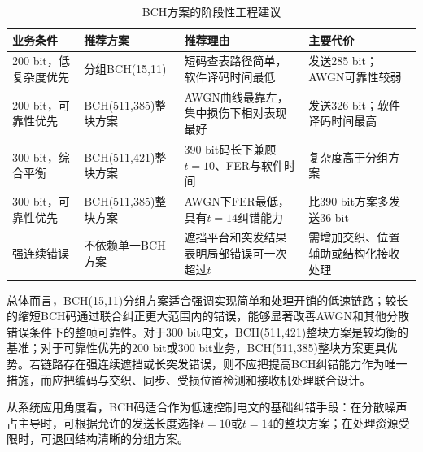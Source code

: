 \begin{table}[htbp]
  \centering
  \scriptsize
  \caption{BCH方案的阶段性工程建议}
  \label{tab:bch-conclusions}
  \setlength{\tabcolsep}{3pt}
  \begin{tabular}{p{}p{}p{}p{}}
    \toprule
    业务条件 & 推荐方案 & 推荐理由 & 主要代价 \\
    \midrule
    200 bit，低复杂度优先 & 分组BCH(15,11) & 短码查表路径简单，软件译码时间最低 & 发送285 bit；AWGN可靠性较弱 \\
    200 bit，可靠性优先 & BCH(511,385)整块方案 & AWGN曲线最靠左，集中损伤下相对表现最好 & 发送326 bit；软件译码时间最高 \\
    300 bit，综合平衡 & BCH(511,421)整块方案 & 390 bit码长下兼顾$t=10$、FER与软件时间 & 复杂度高于分组方案 \\
    300 bit，可靠性优先 & BCH(511,385)整块方案 & AWGN下FER最低，具有$t=14$纠错能力 & 比390 bit方案多发送36 bit \\
    强连续错误 & 不依赖单一BCH方案 & 遮挡平台和突发结果表明局部错误可一次超过$t$ & 需增加交织、位置辅助或结构化接收处理 \\
    \bottomrule
  \end{tabular}
\end{table}

总体而言，BCH(15,11)分组方案适合强调实现简单和处理开销的低速链路；较长的缩短BCH码通过联合纠正更大范围内的错误，能够显著改善AWGN和其他分散错误条件下的整帧可靠性。对于300 bit电文，BCH(511,421)整块方案是较均衡的基准；对于可靠性优先的200 bit或300 bit业务，BCH(511,385)整块方案更具优势。若链路存在强连续遮挡或长突发错误，则不应把提高BCH纠错能力作为唯一措施，而应把编码与交织、同步、受损位置检测和接收机处理联合设计。

从系统应用角度看，BCH码适合作为低速控制电文的基础纠错手段：在分散噪声占主导时，可根据允许的发送长度选择$t=10$或$t=14$的整块方案；在处理资源受限时，可退回结构清晰的分组方案。

